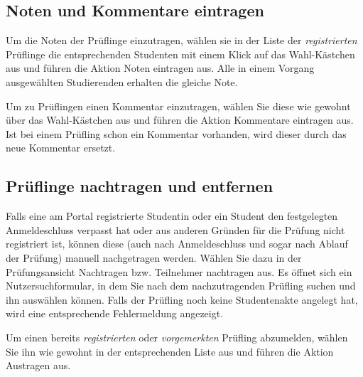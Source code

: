 \documentclass[a4paper,11pt]{article}
\newcommand{\knopf}[1]{{\sc #1}}
\begin{document}
\subsection{Noten und Kommentare eintragen}

Um die Noten der Prüflinge einzutragen, wählen sie in der Liste der {\em
  registrierten} Prüflinge die entsprechenden Studenten mit einem
Klick auf das Wahl-Kästchen aus und führen die Aktion \knopf{Noten
  eintragen} aus. Alle in einem Vorgang ausgewählten Studierenden erhalten die
gleiche Note.

Um zu Prüflingen einen Kommentar einzutragen, wählen Sie diese
wie gewohnt über das Wahl-Kästchen aus und führen die Aktion \knopf{Kommentare
  eintragen} aus. Ist bei einem Prüfling schon ein Kommentar vorhanden, wird dieser durch das neue Kommentar ersetzt.

\subsection{Prüflinge nachtragen und entfernen}

Falls eine am Portal registrierte Studentin oder ein Student den festgelegten Anmeldeschluss
verpasst hat oder aus anderen Gründen für die Prüfung nicht registriert ist,
können diese (auch nach Anmeldeschluss und sogar nach Ablauf der Prüfung)
manuell nachgetragen werden. Wählen Sie dazu in der Prüfungsansicht \knopf{Nachtragen} bzw. \knopf{Teilnehmer nachtragen}
aus. Es öffnet sich ein Nutzersuchformular, in dem Sie nach dem
nachzutragenden Prüfling suchen und ihn auswählen können. Falls der Prüfling
noch keine Studentenakte angelegt hat, wird eine entsprechende
Fehlermeldung  angezeigt.

Um einen bereits {\em registrierten} oder {\em vorgemerkten} Prüfling abzumelden, wählen
Sie ihn wie gewohnt in der entsprechenden Liste aus und führen die Aktion
\knopf{Austragen} aus.
\end{document}

